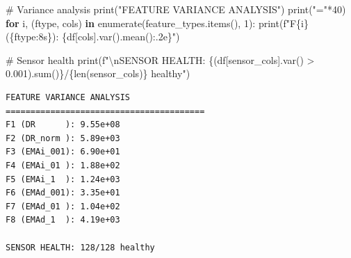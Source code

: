 \documentclass[
  letterpaper,
  DIV=11,
  numbers=noendperiod]{scrartcl}
\newenvironment{Shaded}{\begin{snugshade}}{\end{snugshade}}
\newcommand{\BuiltInTok}[1]{\textcolor[rgb]{0.00,0.23,0.31}{#1}}
\newcommand{\CharTok}[1]{\textcolor[rgb]{0.13,0.47,0.30}{#1}}
\newcommand{\CommentTok}[1]{\textcolor[rgb]{0.37,0.37,0.37}{#1}}
\newcommand{\ControlFlowTok}[1]{\textcolor[rgb]{0.00,0.23,0.31}{\textbf{#1}}}
\newcommand{\DecValTok}[1]{\textcolor[rgb]{0.68,0.00,0.00}{#1}}
\newcommand{\FloatTok}[1]{\textcolor[rgb]{0.68,0.00,0.00}{#1}}
\newcommand{\KeywordTok}[1]{\textcolor[rgb]{0.00,0.23,0.31}{\textbf{#1}}}
\newcommand{\NormalTok}[1]{\textcolor[rgb]{0.00,0.23,0.31}{#1}}
\newcommand{\OperatorTok}[1]{\textcolor[rgb]{0.37,0.37,0.37}{#1}}
\newcommand{\SpecialCharTok}[1]{\textcolor[rgb]{0.37,0.37,0.37}{#1}}
\newcommand{\SpecialStringTok}[1]{\textcolor[rgb]{0.13,0.47,0.30}{#1}}
\newcommand{\StringTok}[1]{\textcolor[rgb]{0.13,0.47,0.30}{#1}}
\renewenvironment{Shaded}{%
  \begin{tcolorbox}[%
    enhanced,%
    colback=codebg,%
    colframe=codebg,%
    borderline west={3pt}{0pt}{sectionblue},%
    fontupper=\small\ttfamily,%
    boxrule=0pt,%
    arc=0pt,%
    boxsep=5pt,%
    left=2mm,%
    right=2mm,%
    top=2mm,%
    bottom=2mm%
  ]%
}{%
  \end{tcolorbox}%
}
\begin{document}
\begin{Shaded}
\begin{Highlighting}[]
\CommentTok{\# Variance analysis}
\BuiltInTok{print}\NormalTok{(}\StringTok{"FEATURE VARIANCE ANALYSIS"}\NormalTok{)}
\BuiltInTok{print}\NormalTok{(}\StringTok{"="}\OperatorTok{*}\DecValTok{40}\NormalTok{)}
\ControlFlowTok{for}\NormalTok{ i, (ftype, cols) }\KeywordTok{in} \BuiltInTok{enumerate}\NormalTok{(feature\_types.items(), }\DecValTok{1}\NormalTok{):}
    \BuiltInTok{print}\NormalTok{(}\SpecialStringTok{f"F}\SpecialCharTok{\{}\NormalTok{i}\SpecialCharTok{\}}\SpecialStringTok{ (}\SpecialCharTok{\{}\NormalTok{ftype}\SpecialCharTok{:8s\}}\SpecialStringTok{): }\SpecialCharTok{\{}\NormalTok{df[cols]}\SpecialCharTok{.}\NormalTok{var()}\SpecialCharTok{.}\NormalTok{mean()}\SpecialCharTok{:.2e\}}\SpecialStringTok{"}\NormalTok{)}

\CommentTok{\# Sensor health}
\BuiltInTok{print}\NormalTok{(}\SpecialStringTok{f"}\CharTok{\textbackslash{}n}\SpecialStringTok{SENSOR HEALTH: }\SpecialCharTok{\{}\NormalTok{(df[sensor\_cols].var() }\OperatorTok{\textgreater{}} \FloatTok{0.001}\NormalTok{)}\SpecialCharTok{.}\BuiltInTok{sum}\NormalTok{()}\SpecialCharTok{\}}\SpecialStringTok{/}\SpecialCharTok{\{}\BuiltInTok{len}\NormalTok{(sensor\_cols)}\SpecialCharTok{\}}\SpecialStringTok{ healthy"}\NormalTok{)}
\end{Highlighting}
\end{Shaded}

\begin{verbatim}
FEATURE VARIANCE ANALYSIS
========================================
F1 (DR      ): 9.55e+08
F2 (DR_norm ): 5.89e+03
F3 (EMAi_001): 6.90e+01
F4 (EMAi_01 ): 1.88e+02
F5 (EMAi_1  ): 1.24e+03
F6 (EMAd_001): 3.35e+01
F7 (EMAd_01 ): 1.04e+02
F8 (EMAd_1  ): 4.19e+03

SENSOR HEALTH: 128/128 healthy
\end{verbatim}
\end{document}
